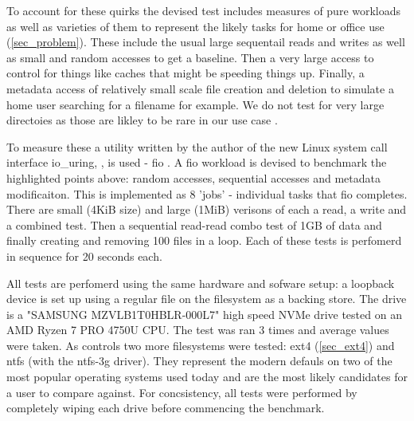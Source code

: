         To account for these quirks the devised test includes measures of pure
        workloads as well as varieties of them to represent the likely tasks
        for home or office use (\ref{sec_problem}). These include the usual
        large sequentail reads and writes as well as small and random accesses
        to get a baseline. Then a very large access to control for things like
        caches that might be speeding things up. Finally, a metadata access of
        relatively small scale file creation and deletion to simulate a home
        user searching for a filename for example. We do not test for very
        large directoies as those are likley to be rare in our use case
        \cite{contents_study}.


        To measure these a utility written by the author of the new Linux
        system call interface io\_uring, \citeauthor{IO_uring}, is used - fio
        \cite{fio}. A fio workload is devised to benchmark the highlighted
        points above: random accesses, sequential accesses and metadata
        modificaiton. This is implemented as 8 'jobs' - individual tasks that
        fio completes. There are small (4KiB size) and large (1MiB) verisons
        of each a read, a write and a combined test. Then a sequential
        read-read combo test of 1GB of data and finally creating and removing
        100 files in a loop. Each of these tests is perfomerd in sequence for
        20 seconds each.

        All tests are perfomerd using the same hardware and sofware setup: a
        loopback device is set up using a regular file on the filesystem as a
        backing store. The drive is a "SAMSUNG MZVLB1T0HBLR-000L7" high speed
        NVMe drive tested on an AMD Ryzen 7 PRO 4750U CPU. The test was ran 3
        times and average values were taken. As controls two more filesystems
        were tested: ext4 (\ref{sec_ext4}) and ntfs (with the ntfs-3g driver).
        They represent the modern defauls on two of the most popular operating
        systems used today and are the most likely candidates for a user to
        compare against. For concsistency, all tests were performed by
        completely wiping each drive before commencing the benchmark.



